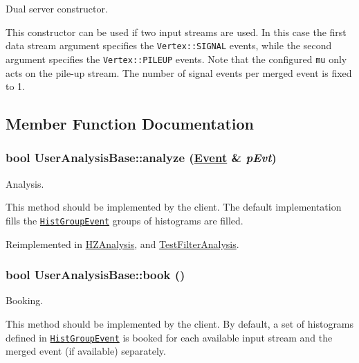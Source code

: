 Dual server constructor. 

This constructor can be used if two input streams are used. In this case the first data stream argument specifies the {\tt Vertex::SIGNAL} events, while the second argument specifies the {\tt Vertex::PILEUP} events. Note that the configured {\tt mu} only acts on the pile-up stream. The number of signal events per merged event is fixed to 1. 

\subsection{Member Function Documentation}
\hypertarget{classUserAnalysisBase_015733b03dfc2596dfaf1841ca60a0b8}{
\subsubsection[analyze]{\setlength{\rightskip}{0pt plus 5cm}bool User\-Analysis\-Base::analyze (\hyperlink{classEvent}{Event} \& {\em p\-Evt})}}
\label{classUserAnalysisBase_015733b03dfc2596dfaf1841ca60a0b8}


Analysis. 

This method should be implemented by the client. The default implementation fills the {\tt \hyperlink{classHistGroupEvent}{Hist\-Group\-Event}} groups of histograms are filled. 

Reimplemented in \hyperlink{classHZAnalysis_9ff7e307f88b5a063fc047b38814c36c}{HZAnalysis}, and \hyperlink{classTestFilterAnalysis_83c3094d993fde404e375cf272f4e5b1}{Test\-Filter\-Analysis}.\hypertarget{classUserAnalysisBase_4ed3754992929a1aeb1e938b31ec22af}{
\subsubsection[book]{\setlength{\rightskip}{0pt plus 5cm}bool User\-Analysis\-Base::book ()}}
\label{classUserAnalysisBase_4ed3754992929a1aeb1e938b31ec22af}


Booking. 

This method should be implemented by the client. By default, a set of histograms defined in {\tt \hyperlink{classHistGroupEvent}{Hist\-Group\-Event}} is booked for each available input stream and the merged event (if available) separately. 

